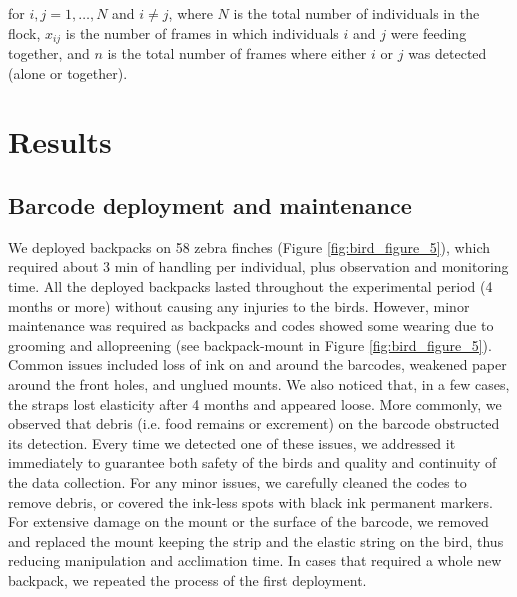 \documentclass[11pt,a4paper,twoside]{book}
\begin{document}
\begin{doublespace}
for $i, j = 1, \dots, N$ and $i \neq j$, where $N$ is the total number of individuals in the flock, $x_{ij}$ is the number of frames in which individuals $i$ and $j$ were feeding together, and $n$ is the total number of frames where either $i$ or $j$ was detected (alone or together).

\section{Results}
\subsection{Barcode deployment and maintenance}
We deployed backpacks on 58 zebra finches (Figure \ref{fig:bird_figure_5}), which required about 3 min of handling per individual, plus observation and monitoring time. All the deployed backpacks lasted throughout the experimental period (4 months or more) without causing any injuries to the birds. However, minor maintenance was required as backpacks and codes showed some wearing due to grooming and allopreening (see backpack‐mount in Figure \ref{fig:bird_figure_5}). Common issues included loss of ink on and around the barcodes, weakened paper around the front holes, and unglued mounts. We also noticed that, in a few cases, the straps lost elasticity after 4 months and appeared loose. More commonly, we observed that debris (i.e. food remains or excrement) on the barcode obstructed its detection. Every time we detected one of these issues, we addressed it immediately to guarantee both safety of the birds and quality and continuity of the data collection. For any minor issues, we carefully cleaned the codes to remove debris, or covered the ink‐less spots with black ink permanent markers. For extensive damage on the mount or the surface of the barcode, we removed and replaced the mount keeping the strip and the elastic string on the bird, thus reducing manipulation and acclimation time. In cases that required a whole new backpack, we repeated the process of the first deployment.


\end{doublespace}
\end{document}

